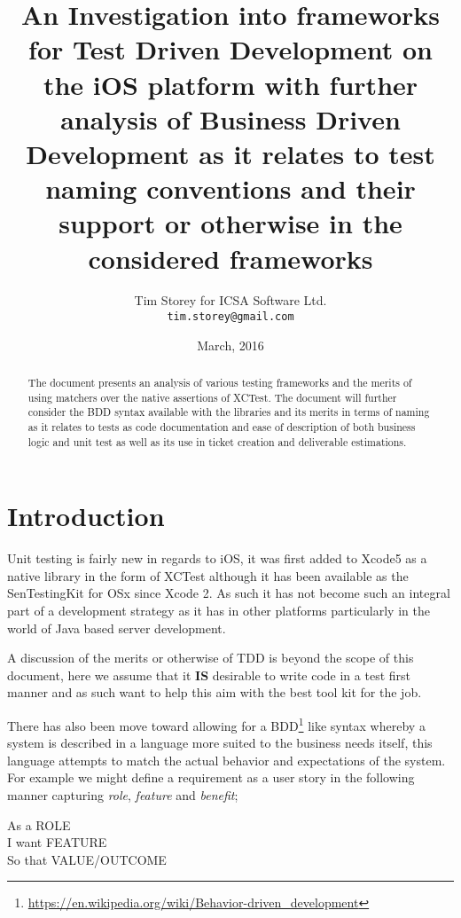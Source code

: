 \documentclass[a4paper, titlepage]{article}
\title{An Investigation into frameworks for Test Driven
Development on the iOS platform with further
analysis of Business Driven Development as it relates to test naming
conventions and their support or otherwise in the considered frameworks}
\author{Tim Storey \hfill for \hfill ICSA Software Ltd.
        \\\texttt{tim.storey@gmail.com}}
\date{March, 2016}
\begin{document}
\maketitle

\begin{abstract}
  The document presents an analysis of various testing frameworks
  and the merits of using matchers over the native assertions of
  XCTest. The document will further consider the  BDD syntax available with the
  libraries and its merits in terms of naming as it relates to tests as code documentation
  and ease of description of both business logic and unit test as well
  as its use in ticket creation and deliverable estimations.
  \end{abstract}

\newpage

\section{Introduction}
  \label{sec:Intro}
  Unit testing is fairly new in regards to iOS, it was first added to
  Xcode5 as a native library in the form of XCTest although it has been available
  as the SenTestingKit for OSx since Xcode 2. As such it has not become such an
  integral part of a development strategy as it has in other
  platforms particularly in the world of Java based server development.

  A discussion of the merits or otherwise of TDD is beyond the scope of
  this document, here we assume that it \textbf{IS} desirable to write
  code in a test first manner and as such want to help this aim with the best
  tool kit for the job.
  
  There has also been move toward allowing for a 
  BDD\footnote{\url{https://en.wikipedia.org/wiki/Behavior-driven_development}} 
  like syntax whereby a system is
  described in a language more suited to the business needs itself, this
  language attempts to match the actual behavior and expectations of
  the system.\\For example we might define a requirement as a user
  story in the following manner capturing \textit{role},
  \textit{feature} and \textit{benefit};

  \begin{spec}{0.5}
    \ac{As a }{ROLE}\\
    \ac{I want }{FEATURE}\\
    \ac{So that }{VALUE/OUTCOME}
  \end{spec}
\end{document}
